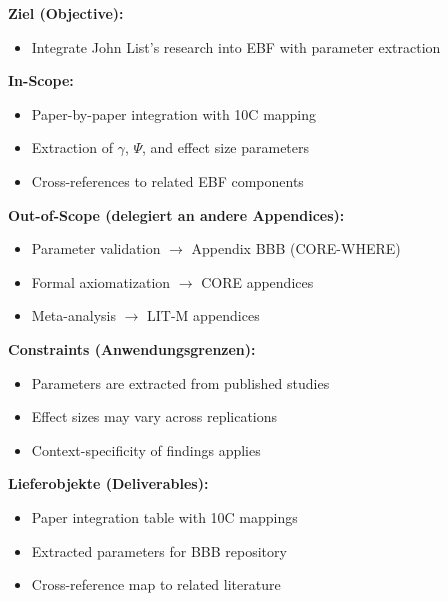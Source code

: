
\begin{tcolorbox}[
    colback=orange!5!white,
    colframe=orange!75!black,
    title={\textbf{Appendix Scope: Ziel / In-Scope / Out-of-Scope / Constraints}},
    fonttitle=\bfseries
]

\textbf{Ziel (Objective):}
\begin{itemize}[nosep]
    \item Integrate John List's research into EBF with parameter extraction
\end{itemize}

\textbf{In-Scope:}
\begin{itemize}[nosep]
    \item Paper-by-paper integration with 10C mapping
    \item Extraction of $\gamma$, $\Psi$, and effect size parameters
    \item Cross-references to related EBF components
\end{itemize}

\textbf{Out-of-Scope (delegiert an andere Appendices):}
\begin{itemize}[nosep]
    \item Parameter validation $\rightarrow$ Appendix BBB (CORE-WHERE)
    \item Formal axiomatization $\rightarrow$ CORE appendices
    \item Meta-analysis $\rightarrow$ LIT-M appendices
\end{itemize}

\textbf{Constraints (Anwendungsgrenzen):}
\begin{itemize}[nosep]
    \item Parameters are extracted from published studies
    \item Effect sizes may vary across replications
    \item Context-specificity of findings applies
\end{itemize}

\textbf{Lieferobjekte (Deliverables):}
\begin{itemize}[nosep]
    \item Paper integration table with 10C mappings
    \item Extracted parameters for BBB repository
    \item Cross-reference map to related literature
\end{itemize}

\end{tcolorbox}

